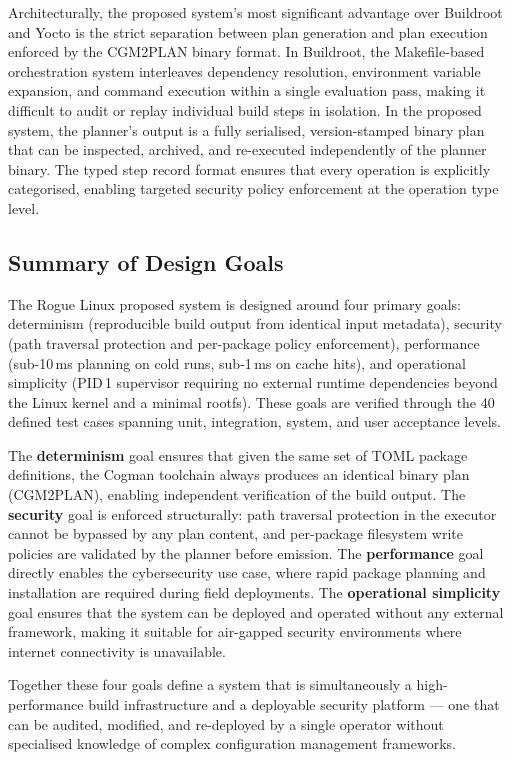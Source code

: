 \documentclass[12pt,a4paper]{report}
\begin{document}
Architecturally, the proposed system's most significant advantage over Buildroot and
Yocto is the strict separation between plan generation and plan execution enforced by
the CGM2PLAN binary format. In Buildroot, the Makefile-based orchestration system
interleaves dependency resolution, environment variable expansion, and command
execution within a single evaluation pass, making it difficult to audit or replay
individual build steps in isolation. In the proposed system, the planner's output is
a fully serialised, version-stamped binary plan that can be inspected, archived, and
re-executed independently of the planner binary. The typed step record format ensures
that every operation is explicitly categorised, enabling targeted security policy
enforcement at the operation type level.

\subsection{Summary of Design Goals}

The Rogue Linux proposed system is designed around four primary goals: determinism
(reproducible build output from identical input metadata), security (path traversal
protection and per-package policy enforcement), performance (sub-10\,ms planning on
cold runs, sub-1\,ms on cache hits), and operational simplicity (PID\,1 supervisor
requiring no external runtime dependencies beyond the Linux kernel and a minimal
rootfs). These goals are verified through the 40 defined test cases spanning unit,
integration, system, and user acceptance levels.

The \textbf{determinism} goal ensures that given the same set of TOML package
definitions, the Cogman toolchain always produces an identical binary plan
(CGM2PLAN), enabling independent verification of the build output. The
\textbf{security} goal is enforced structurally: path traversal protection in the
executor cannot be bypassed by any plan content, and per-package filesystem write
policies are validated by the planner before emission. The \textbf{performance}
goal directly enables the cybersecurity use case, where rapid package planning
and installation are required during field deployments. The \textbf{operational
simplicity} goal ensures that the system can be deployed and operated without any
external framework, making it suitable for air-gapped security environments where
internet connectivity is unavailable.

Together these four goals define a system that is simultaneously a
high-performance build infrastructure and a deployable security platform --- one
that can be audited, modified, and re-deployed by a single operator without
specialised knowledge of complex configuration management frameworks.
\end{document}
